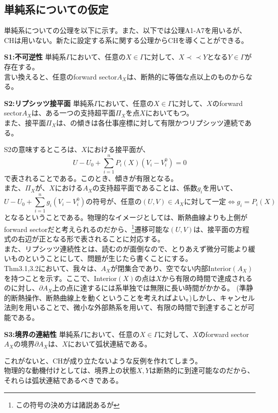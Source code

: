 \documentclass[a4paper,11pt]{jsarticle}
\numberwithin{equation}{section}
\begin{document}
\subsection{単純系についての仮定}
単純系についての公理を以下に示す。また、以下では公理A1-A7を用いるが、CHは用いない。新たに設定する系に関する公理からCHを導くことができる。\\

\begin{itembox}[l]{\textbf{S1:不可逆性}}
    単純系$\Gamma$において、任意の$X \in \Gamma$に対して、$X \prec \prec Y$となる$Y \in \Gamma$が存在する。\\
    言い換えると、任意のforward sector$A_X$は、断熱的に等価な点以上のものからなる。
\end{itembox}

\begin{itembox}[l]{\textbf{S2:リプシッツ接平面}}
    単純系$\Gamma$において、任意の$X \in \Gamma$に対して、$X$のforward sector$A_X$は、ある一つの支持超平面$\Pi_X$を点$X$においてもつ。\\
    また、接平面$\Pi_X$は、の傾きは各仕事座標に対して有限かつリプシッツ連続である。
\end{itembox}
S2の意味するところは、$X$における接平面が、
\begin{equation}
    U-U_0 +\sum_{i=1}^n P_i(X)(V_i-V_i^0) = 0
\end{equation}
で表されることである。このとき、傾きが有限となる。\\
また、$\Pi_X$が、$X$における$A_X$の支持超平面であることは、係数$g_i$を用いて、
\begin{equation}
    U-U_0 +\sum_{i=1}^n g_i(V_i-V_i^0) の符号が、任意の(U,V)\in A_X に対して一定 \Leftrightarrow g_i = P_i(X)
\end{equation}
となるということである。物理的なイメージとしては、断熱曲線よりも上側がforward sectorだと考えられるのだから、\footnote{この符号の決め方は諸説あるが}遷移可能な$(U,V)$は、接平面の方程式の右辺が正となる形で表されることに対応する。\\
また、リプシッツ連続性とは、読むのが面倒なので、とりあえず微分可能より緩いものということにして、問題が生じたら書くことにする。\\

Thm3.1,3.2において、我々は、$A_X$が閉集合であり、空でない内部$\text{Interior}(A_X)$を持つことを示す。ここで、Interior$(X)$の点は$X$から有限の時間で達成されるのに対し、$\partial A_X$上の点に達するには系単独では無限に長い時間がかかる。
(準静的断熱操作、断熱曲線上を動くということを考えればよい。)しかし、キャンセル法則を用いることで、微小な外部熱系を用いて、有限の時間で到達することが可能である。
\begin{itembox}[l]{\textbf{S3:境界の連結性}}
    単純系$\Gamma$において、任意の$X \in \Gamma$に対して、$X$のforward sector$A_X$の境界$\partial A_X$は、$X$において弧状連結である。
\end{itembox}
これがないと、CHが成り立たないような反例を作れてしまう。\\
物理的な動機付けとしては、境界上の状態$X,Y$は断熱的に到達可能なのだから、それらは弧状連結であるべきである。\\
\end{document}
